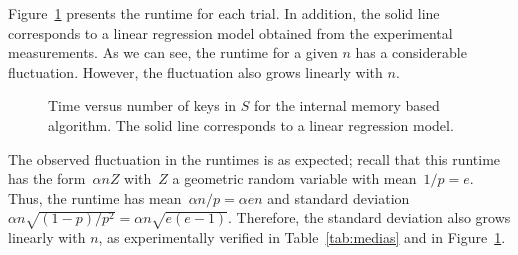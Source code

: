 \enlargethispage{2\baselineskip}
Figure~\ref{fig:bmz_temporegressao} 
presents the runtime for each trial. In addition, 
the solid line corresponds to a linear regression model 
obtained from the experimental measurements.
As we can see, the runtime for a given $n$ has a considerable 
fluctuation. However, the fluctuation also grows linearly with $n$.

\begin{figure}[htb]
\vspace{-2mm}
\begin{center}
\caption{Time versus number of keys in $S$ for the internal memory based algorithm.
The solid line corresponds to a linear regression model.}
\label{fig:bmz_temporegressao}
\end{center}
\vspace{-6mm}
\end{figure}

The observed fluctuation in the runtimes is as expected; recall that this
runtime has the form~$\alpha nZ$ with~$Z$ a geometric random variable with
mean~$1/p=e$.  Thus, the runtime has mean~$\alpha n/p=\alpha en$ and standard
deviation~$\alpha n\sqrt{(1-p)/p^2}=\alpha n\sqrt{e(e-1)}$. 
Therefore, the standard deviation also grows 
linearly with $n$, as experimentally verified 
in Table~\ref{tab:medias} and in Figure~\ref{fig:bmz_temporegressao}.

